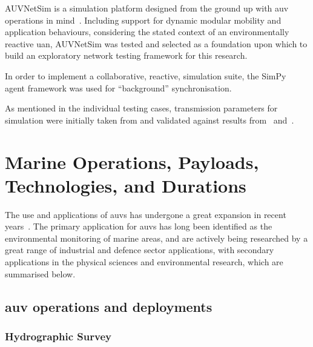AUVNetSim is a simulation platform designed from the ground up with \gls{auv} operations in mind~\cite{Miquel2008}.
Including support for dynamic modular mobility and application behaviours, considering the stated context of an environmentally reactive \gls{uan}, AUVNetSim was tested and selected as a foundation upon which to build an exploratory network testing framework for this research.

In order to implement a collaborative, reactive, simulation suite, the SimPy~\cite{Mueller2003SimPy} agent framework was used for ``background'' synchronisation.

As mentioned in the individual testing cases, transmission parameters for simulation were initially taken from and validated against results from~\citet{Stojanovic2007} and~\citet{Stefanov2011}.


\begin{comment}
\subsection{Routing and Network Design for \glspl{uan}}

Forward Error Correction coding is used on such channels to minimise packet losses.

\todo{ADD:Summary of Akyildiz02/05}

\todo{FIX:callback to routing discussion in c1 explain why fbr is the best of everything all the time}
\end{comment}
\pagebreak
\section{Marine Operations, Payloads, Technologies, and Durations}\label{sec:marine_ops}

The use and applications of \glspl{auv} has undergone a great expansion in recent years~\cite{Alam2014}.
The primary application for \glspl{auv} has long been identified as the environmental monitoring of marine areas, and are actively being researched by a great range of industrial and defence sector applications, with secondary applications in the physical sciences and environmental research, which are summarised below\cite{Bingham2002,Wynn2014}.

\subsection{\gls{auv} operations and deployments}

\subsubsection{Hydrographic Survey}

